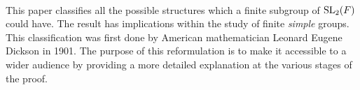 \\
This paper classifies all the possible structures which a finite subgroup of $\operatorname{SL}_2(F)$ could have. The result has implications within the study of finite \textit{simple} groups. This classification was first done by American mathematician Leonard Eugene Dickson in 1901. The purpose of this reformulation is to make it accessible to a wider audience by providing a more detailed explanation at the various stages of the proof.


